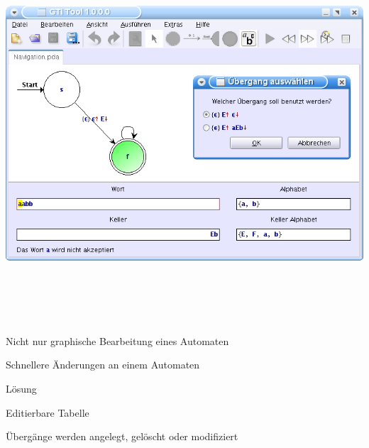 {
  \begin{center}
    \includegraphics[height=14cm]{../images/grammar_pda.png}
  \end{center}
}


{
    \begin{itemgroup}{}
	\item Nicht nur graphische Bearbeitung eines Automaten
	\item Schnellere Änderungen an einem Automaten
    \end{itemgroup}

    \begin{itemgroup}{Lösung}
	\item Editierbare Tabelle
	\item Übergänge werden angelegt, gelöscht oder modifiziert
	\end{itemgroup}
    
    \vfill{}
}


